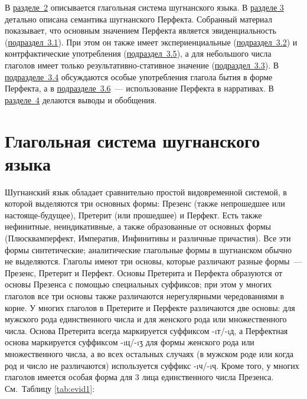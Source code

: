 В \hyperref[evid-verb]{разделе~2} описывается глагольная система шугнанского языка. В \hyperref[evid-sem]{разделе 3} детально описана семантика шугнанского Перфекта. Собранный материал показывает, что основным значением Перфекта является эвиденциальность (\hyperref[evid-evid]{подраздел~3.1}). При этом он также имеет экспериенциальные (\hyperref[evid-exper]{подраздел~3.2}) и контрфактические употребления (\hyperref[evid-modal]{подраздел~3.5}), а для небольшого числа глаголов имеет только результативно-стативное значение (\hyperref[evid-result]{подраздел~3.3}). В \hyperref[evid-be]{подразделе~3.4} обсуждаются особые употребления глагола бытия в форме Перфекта, а в \hyperref[evid-narr]{подразделе~3.6}~— использование Перфекта в нарративах. В \hyperref[evid-conclusion]{разделе~4} делаются выводы и обобщения.

\section{Глагольная система шугнанского языка} \label{evid-verb}

Шугнанский язык обладает сравнительно простой видовременной системой, в которой выделяются три основных формы: Презенс (также непрошедшее или настояще-будущее), Претерит (или прошедшее) и Перфект. Есть также нефинитные, неиндикативные, а также образованные от основных формы (Плюсквамперфект, Императив, Инфинитивы и различные причастия). Все эти формы синтетические; аналитические глагольные формы в шугнанском обычно не выделяются. Глаголы имеют три основы, которые различают разные формы~— Презенс, Претерит и Перфект. Основы Претерита и Перфекта образуются от основы Презенса с помощью специальных суффиксов; при этом у многих глаголов все три основы также различаются нерегулярными чередованиями в корне. У многих глаголов в Претерите и Перфекте различаются две основы: для мужского рода единственного числа и для женского рода или множественного числа. Основа Претерита всегда маркируется суффиксом -\i{т}/-\i{д}, а Перфектная основа маркируется суффиксом -\i{ц}/-\i{ӡ} для формы женского рода или множественного числа, а во всех остальных случаях (в мужском роде или когда род и число не различаются) используется суффикс -\i{ч}/-\i{ҷ}. Кроме того, у многих глаголов имеется особая форма для 3 лица единственного числа Презенса. См.~Таблицу \ref{tab:evid1}:

